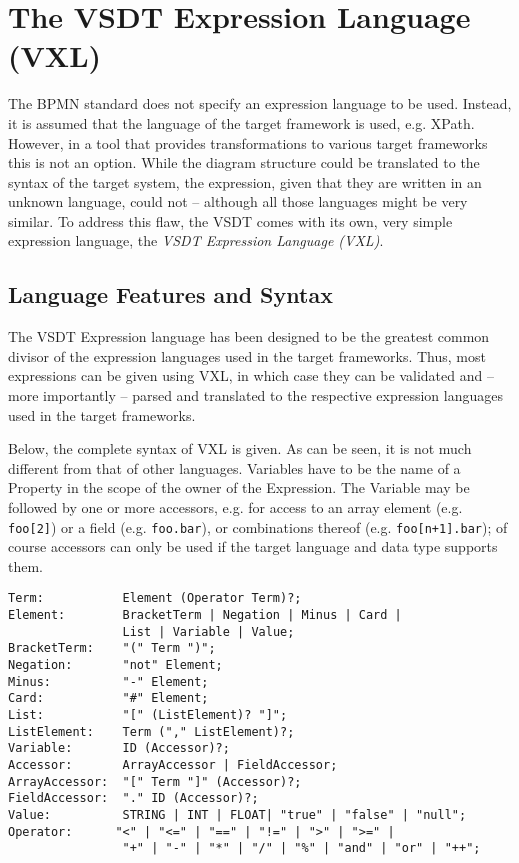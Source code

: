 \chapter{The VSDT Expression Language (VXL)}
\label{sec:vxl}

The BPMN standard does not specify an expression language to be used.  Instead,
it is assumed that the language of the target framework is used, e.g.  XPath.
However, in a tool that provides transformations to various target frameworks
this is not an option.  While the diagram structure could be translated to the
syntax of the target system, the expression, given that they are written in an
unknown language, could not -- although all those languages might be very similar.
To address this flaw, the VSDT comes with its own, very simple expression language,
the \emph{VSDT Expression Language (VXL)}.



\section{Language Features and Syntax}

The VSDT Expression language has been designed to be the greatest common divisor
of the expression languages used in the target frameworks.  Thus, most expressions
can be given using VXL, in which case they can be validated and -- more importantly
-- parsed and translated to the respective expression languages used in the target
frameworks.

Below, the complete syntax of VXL is given.  As can be seen, it is not much
different from that of other languages.  Variables have to be the name of a
Property in the scope of the owner of the Expression.  The Variable may be followed
by one or more accessors, e.g. for access to an array element (e.g. \verb_foo[2]_)
or a field (e.g. \verb_foo.bar_), or combinations thereof (e.g. \verb_foo[n+1].bar_);
of course accessors can only be used if the target language and data type supports
them.

\begin{verbatim}
Term:           Element (Operator Term)?;
Element:        BracketTerm | Negation | Minus | Card |
                List | Variable | Value;
BracketTerm:    "(" Term ")";
Negation:       "not" Element;
Minus:          "-" Element;
Card:           "#" Element;
List:           "[" (ListElement)? "]";
ListElement:    Term ("," ListElement)?;
Variable:       ID (Accessor)?;
Accessor:       ArrayAccessor | FieldAccessor;
ArrayAccessor:  "[" Term "]" (Accessor)?;
FieldAccessor:  "." ID (Accessor)?;
Value:          STRING | INT | FLOAT| "true" | "false" | "null";
Operator:      "<" | "<=" | "==" | "!=" | ">" | ">=" | 
                "+" | "-" | "*" | "/" | "%" | "and" | "or" | "++";
\end{verbatim}


